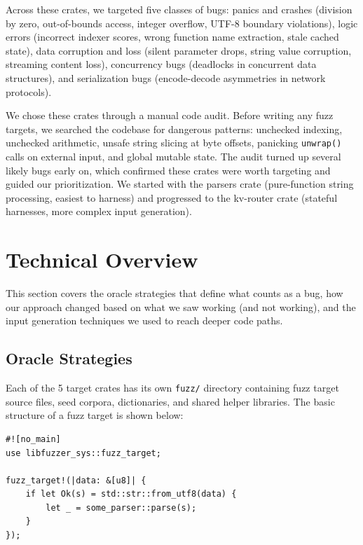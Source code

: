 \documentclass[11pt]{article}
\begin{document}
Across these crates, we targeted five classes of bugs: panics and crashes (division by zero, out-of-bounds access, integer overflow, UTF-8 boundary violations), logic errors (incorrect indexer scores, wrong function name extraction, stale cached state), data corruption and loss (silent parameter drops, string value corruption, streaming content loss), concurrency bugs (deadlocks in concurrent data structures), and serialization bugs (encode-decode asymmetries in network protocols).

We chose these crates through a manual code audit. Before writing any fuzz targets, we searched the codebase for dangerous patterns: unchecked indexing, unchecked arithmetic, unsafe string slicing at byte offsets, panicking \texttt{unwrap()} calls on external input, and global mutable state. The audit turned up several likely bugs early on, which confirmed these crates were worth targeting and guided our prioritization. We started with the parsers crate (pure-function string processing, easiest to harness) and progressed to the kv-router crate (stateful harnesses, more complex input generation).

\section{Technical Overview}

This section covers the oracle strategies that define what counts as a bug, how our approach changed based on what we saw working (and not working), and the input generation techniques we used to reach deeper code paths.

\subsection{Oracle Strategies}

Each of the 5 target crates has its own \texttt{fuzz/} directory containing fuzz target source files, seed corpora, dictionaries, and shared helper libraries. The basic structure of a fuzz target is shown below:

\begin{lstlisting}[caption={Basic crash oracle fuzz target}]
#![no_main]
use libfuzzer_sys::fuzz_target;

fuzz_target!(|data: &[u8]| {
    if let Ok(s) = std::str::from_utf8(data) {
        let _ = some_parser::parse(s);
    }
});
\end{lstlisting}
\end{document}
